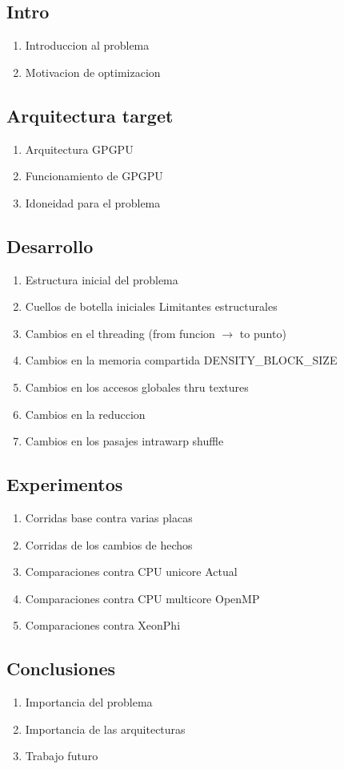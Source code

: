 \subsection{Intro}
\begin{enumerate}
 \item Introduccion al problema
 \item Motivacion de optimizacion
\end{enumerate}
\subsection{Arquitectura target}
\begin{enumerate}
 \item Arquitectura GPGPU
 \item Funcionamiento de GPGPU
 \item Idoneidad para el problema
\end{enumerate}
\subsection{Desarrollo}
\begin{enumerate}
 \item Estructura inicial del problema
 \item Cuellos de botella iniciales \- Limitantes estructurales
 \item Cambios en el threading (from funcion $\rightarrow$ to punto)
 \item Cambios en la memoria compartida \- DENSITY\_BLOCK\_SIZE
 \item Cambios en los accesos globales thru textures
 \item Cambios en la reduccion
 \item Cambios en los pasajes intrawarp shuffle
\end{enumerate}

\subsection{Experimentos}
\begin{enumerate}
 \item Corridas base contra varias placas
 \item Corridas de los cambios de hechos
 \item Comparaciones contra CPU unicore Actual
 \item Comparaciones contra CPU multicore OpenMP
 \item Comparaciones contra XeonPhi
\end{enumerate}

\subsection{Conclusiones}
\begin{enumerate}
 \item Importancia del problema
 \item Importancia de las arquitecturas
 \item Trabajo futuro
\end{enumerate}


